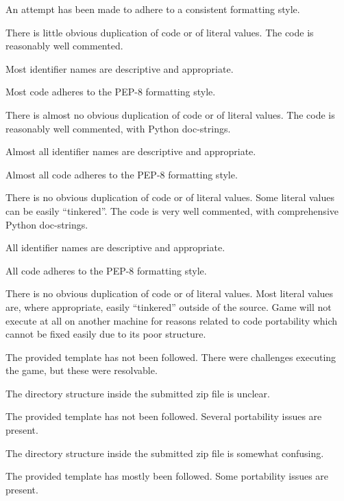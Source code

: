 \documentclass{../fal_assignment}
\begin{document}
\begin{markingrubric}
            \par An attempt has been made to adhere to a consistent formatting style.
             \par There is little obvious duplication of code or of literal values.           
        \grade The code is reasonably well commented.
            \par Most identifier names are descriptive and appropriate.
            \par Most code adheres to the PEP-8 formatting style.
             \par There is almost no obvious duplication of code or of literal values.   
        \grade The code is reasonably well commented, with Python doc-strings.
            \par Almost all identifier names are descriptive and appropriate.
            \par Almost all code adheres to the PEP-8 formatting style.
             \par There is no obvious duplication of code or of literal values. Some literal values can be easily ``tinkered''. 
        \grade The code is very well commented, with comprehensive Python doc-strings.
            \par All identifier names are descriptive and appropriate.
            \par All code adheres to the PEP-8 formatting style.
             \par There is no obvious duplication of code or of literal values. Most literal values are, where appropriate, easily ``tinkered'' outside of the source.  
%
        \grade\fail Game will not execute at all on another machine for reasons related to code portability which cannot be fixed easily due to its poor structure.
            \par The provided template has not been followed.
        \grade There were challenges executing the game, but these were resolvable.
            \par The directory structure inside the submitted zip file is unclear.
            \par The provided template has not been followed.
        \grade Several portability issues are present.
            \par The directory structure inside the submitted zip file is somewhat confusing.
            \par The provided template has mostly been followed.
        \grade Some portability issues are present.

\end{markingrubric}
\end{document}
